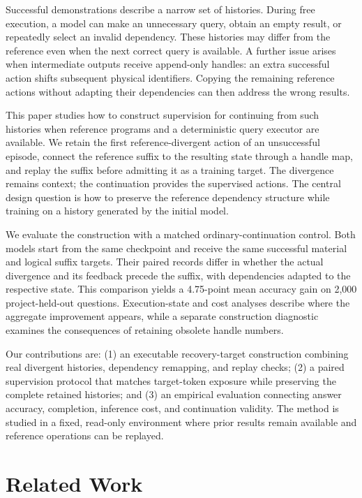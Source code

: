 \documentclass[runningheads]{llncs}
\begin{document}
Successful demonstrations describe a narrow set of histories. During free execution, a model can make an unnecessary query, obtain an empty result, or repeatedly select an invalid dependency. These histories may differ from the reference even when the next correct query is available. A further issue arises when intermediate outputs receive append-only handles: an extra successful action shifts subsequent physical identifiers. Copying the remaining reference actions without adapting their dependencies can then address the wrong results.

This paper studies how to construct supervision for continuing from such histories when reference programs and a deterministic query executor are available. We retain the first reference-divergent action of an unsuccessful episode, connect the reference suffix to the resulting state through a handle map, and replay the suffix before admitting it as a training target. The divergence remains context; the continuation provides the supervised actions. The central design question is how to preserve the reference dependency structure while training on a history generated by the initial model.

We evaluate the construction with a matched ordinary-continuation control. Both models start from the same checkpoint and receive the same successful material and logical suffix targets. Their paired records differ in whether the actual divergence and its feedback precede the suffix, with dependencies adapted to the respective state. This comparison yields a 4.75-point mean accuracy gain on 2,000 project-held-out questions. Execution-state and cost analyses describe where the aggregate improvement appears, while a separate construction diagnostic examines the consequences of retaining obsolete handle numbers.

Our contributions are: (1) an executable recovery-target construction combining real divergent histories, dependency remapping, and replay checks; (2) a paired supervision protocol that matches target-token exposure while preserving the complete retained histories; and (3) an empirical evaluation connecting answer accuracy, completion, inference cost, and continuation validity. The method is studied in a fixed, read-only environment where prior results remain available and reference operations can be replayed.

\section{Related Work}
\end{document}
